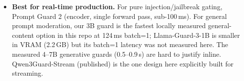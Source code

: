 \begin{itemize}
  \item \textbf{Best for real-time production.} For pure injection/jailbreak gating, Prompt Guard 2 (encoder, single forward pass, sub-100\,ms). For general prompt moderation, our 3B guard is the fastest locally measured general-content option in this repo at 124\,ms batch=1; Llama-Guard-3-1B is smaller in VRAM (2.2\,GB) but its batch=1 latency was not measured here. The measured 4--7B generative guards (0.5--0.9\,s) are hard to justify inline. Qwen3Guard-Stream (published) is the one design here explicitly built for streaming.
\end{itemize}

